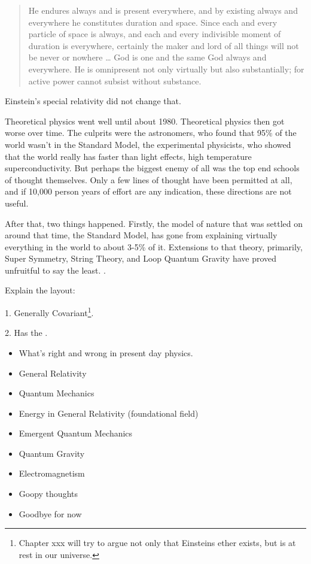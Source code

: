 \documentclass[../rzero]{subfiles}
\begin{document}
\begin{quotation}
	He endures always and is present everywhere, and by existing always and everywhere he constitutes duration and space. Since each and every particle of space is always, and each and every indivisible moment of duration is everywhere, certainly the maker and lord of all things will not be never or nowhere … God is one and the same God always and everywhere. He is omnipresent not only virtually but also substantially; for active power cannot subsist without substance.
\end{quotation} 

Einstein's special relativity did not change that. 

Theoretical physics went well until about 1980. Theoretical physics then got worse over time. The culprits were the astronomers, who found that 95\% of the world wasn't in the Standard Model, the experimental physicists, who showed that the world really has faster than light effects, high temperature superconductivity. But perhaps the biggest enemy of all was the top end schools of thought themselves. Only a few lines of thought have been permitted at all, and if 10,000 person years of effort are any indication, these directions are not useful. 


After that, two things happened. Firstly, the model of nature that was settled on around that time, the Standard Model, has gone from explaining virtually everything in the world to about 3-5\% of it. Extensions to that theory, primarily, Super Symmetry, String Theory, and Loop Quantum Gravity have proved unfruitful to say the least. \cite{woit2007not}\cite{smolin2007trouble}\cite{hossenfelder2018lost}. 




Explain the layout:



1. Generally Covariant\footnote{Chapter xxx will try to argue not only that Einsteins ether exists, but is at rest in our universe.}.

2. Has the .


\begin{itemize}
  \item What's right and wrong in present day physics.
  \item General Relativity
  \item Quantum Mechanics
  \item Energy in General Relativity (foundational field)
  \item Emergent Quantum Mechanics
  \item Quantum Gravity
  \item Electromagnetism
  \item Goopy thoughts 
  \item Goodbye for now
\end{itemize}
\end{document}
